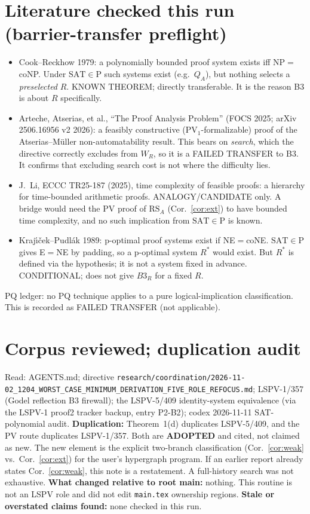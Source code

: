 \documentclass[11pt]{article}
\newcommand{\SAT}{\mathrm{SAT}}
\begin{document}
\section{Literature checked this run (barrier-transfer preflight)}
\begin{itemize}
\item Cook--Reckhow 1979: a polynomially bounded proof system exists iff NP$=$coNP.
Under $\SAT\in\mathrm P$ such systems exist (e.g.\ $Q_A$), but nothing selects a
\emph{preselected} $R$. KNOWN THEOREM; directly transferable. It is the reason B3 is
about $R$ specifically.
\item Arteche, Atserias, et al., ``The Proof Analysis Problem'' (FOCS 2025; arXiv
2506.16956 v2 2026): a feasibly constructive (PV$_1$-formalizable) proof of the
Atserias--M\"uller non-automatability result. This bears on \emph{search}, which the
directive correctly excludes from $W_R$, so it is a FAILED TRANSFER to B3. It confirms
that excluding search cost is not where the difficulty lies.
\item J.~Li, ECCC TR25-187 (2025), time complexity of feasible proofs: a hierarchy for
time-bounded arithmetic proofs. ANALOGY/CANDIDATE only. A bridge would need the PV
proof of $\mathrm{RS}_A$ (Cor.~\ref{cor:ext}) to have bounded time complexity, and no
such implication from $\SAT\in\mathrm P$ is known.
\item Kraj\'{\i}\v{c}ek--Pudl\'ak 1989: p-optimal proof systems exist if NE$=$coNE.
$\SAT\in\mathrm P$ gives E$=$NE by padding, so a p-optimal system $R^\ast$ would exist.
But $R^\ast$ is defined via the hypothesis; it is not a system fixed in advance.
CONDITIONAL; does not give $B3_R$ for a fixed $R$.
\end{itemize}
PQ ledger: no PQ technique applies to a pure logical-implication classification.
This is recorded as FAILED TRANSFER (not applicable).

\section{Corpus reviewed; duplication audit}
Read: AGENTS.md; directive \texttt{research/coordination/2026-11-02\_1204\_WORST\_CASE\_MINIMUM\_DERIVATION\_FIVE\_ROLE\_REFOCUS.md};
LSPV-1/357 (Godel reflection B3 firewall); the LSPV-5/409 identity-system equivalence (via the LSPV-1
proof2 tracker backup, entry P2-B2); codex 2026-11-11 SAT-polynomial audit.
\textbf{Duplication:} Theorem~1(d) duplicates LSPV-5/409, and the PV route
duplicates LSPV-1/357. Both are \textbf{ADOPTED} and cited, not claimed as new. The
new element is the explicit two-branch classification (Cor.~\ref{cor:weak} vs.\
Cor.~\ref{cor:ext}) for the user's hypergraph program. If an earlier report already
states Cor.~\ref{cor:weak}, this note is a restatement. A full-history search
was not exhaustive. \textbf{What changed relative to root main:} nothing. This
routine is not an LSPV role and did not edit \texttt{main.tex} ownership regions.
\textbf{Stale or overstated claims found:} none checked in this run.
\end{document}
